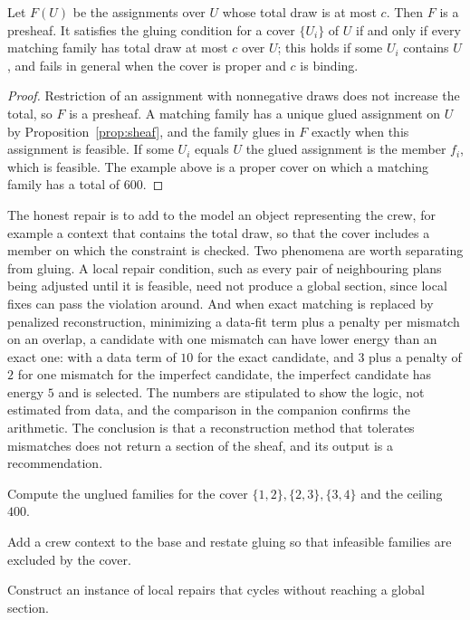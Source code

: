\begin{proposition}\label{prop:glue}
Let $F(U)$ be the assignments over $U$ whose total draw is at most $c$. Then $F$ is a presheaf. It satisfies the gluing condition for a cover $\{U_i\}$ of $U$ if and only if every matching family has total draw at most $c$ over $U$; this holds if some $U_i$ contains $U$, and fails in general when the cover is proper and $c$ is binding.
\end{proposition}

\begin{proof}
Restriction of an assignment with nonnegative draws does not increase the total, so $F$ is a presheaf. A matching family has a unique glued assignment on $U$ by Proposition~\ref{prop:sheaf}, and the family glues in $F$ exactly when this assignment is feasible. If some $U_i$ equals $U$ the glued assignment is the member $f_i$, which is feasible. The example above is a proper cover on which a matching family has a total of $600$.
\end{proof}

The honest repair is to add to the model an object representing the crew, for example a context that contains the total draw, so that the cover includes a member on which the constraint is checked. Two phenomena are worth separating from gluing. A local repair condition, such as every pair of neighbouring plans being adjusted until it is feasible, need not produce a global section, since local fixes can pass the violation around. And when exact matching is replaced by penalized reconstruction, minimizing a data-fit term plus a penalty per mismatch on an overlap, a candidate with one mismatch can have lower energy than an exact one: with a data term of $10$ for the exact candidate, and $3$ plus a penalty of $2$ for one mismatch for the imperfect candidate, the imperfect candidate has energy $5$ and is selected. The numbers are stipulated to show the logic, not estimated from data, and the comparison in the companion confirms the arithmetic. The conclusion is that a reconstruction method that tolerates mismatches does not return a section of the sheaf, and its output is a recommendation.

\begin{exercise}Compute the unglued families for the cover $\{1,2\},\{2,3\},\{3,4\}$ and the ceiling $400$.\end{exercise}
\begin{exercise}Add a crew context to the base and restate gluing so that infeasible families are excluded by the cover.\end{exercise}
\begin{exercise}Construct an instance of local repairs that cycles without reaching a global section.\end{exercise}

